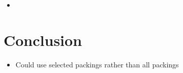 \documentclass{elsarticle}
\begin{document}
{\color{myGreen}
\begin{itemize}[leftmargin=*]
	\item
\end{itemize}
}

\section{Conclusion}
\label{sec:conclusion}

{\color{Orchid}
\begin{itemize}[leftmargin=*]
	\item Could use selected packings rather than all packings
\end{itemize}
}

	



\end{document}
